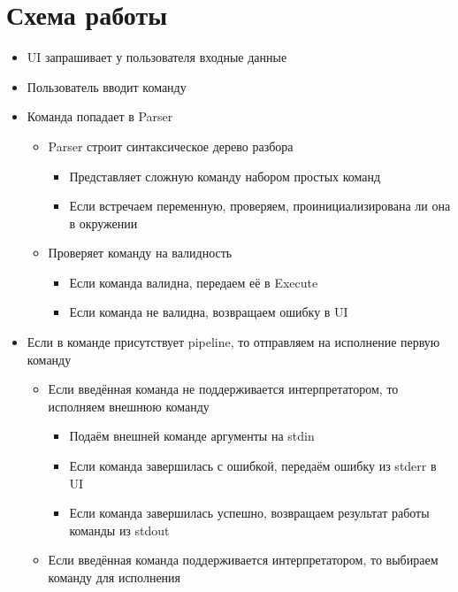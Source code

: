 \documentclass[a4paper,10pt]{article}
\begin{document}
\newpage

\section*{Схема работы}

\begin{itemize}
	\item UI запрашивает у пользователя входные данные
	\item Пользователь вводит команду
	\item Команда попадает в Parser
	      \begin{itemize}
		      \item Parser строит синтаксическое дерево разбора
		            \begin{itemize}
			            \item Представляет сложную команду набором простых команд
			            \item Если встречаем переменную, проверяем, проинициализирована ли она в окружении
		            \end{itemize}
		      \item Проверяет команду на валидность
		            \begin{itemize}
			            \item Если команда валидна, передаем её в Execute
			            \item Если команда не валидна, возвращаем ошибку в UI
		            \end{itemize}
	      \end{itemize}
	\item Если в команде присутствует pipeline, то отправляем на исполнение первую команду
	      \begin{itemize}
		      \item Если введённая команда не поддерживается интерпретатором, то исполняем внешнюю команду
		            \begin{itemize}
			            \item Подаём внешней команде аргументы на stdin
			            \item Если команда завершилась с ошибкой, передаём ошибку из stderr в UI
			            \item Если команда завершилась успешно, возвращаем результат работы команды из stdout
		            \end{itemize}
		      \item Если введённая команда поддерживается интерпретатором, то выбираем команду для исполнения

\end{itemize}
\end{itemize}
\end{document}

